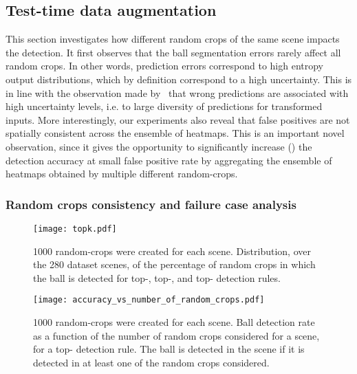 \documentclass[sigconf, screen]{acmart}
\begin{document}
\subsection{Test-time data augmentation}
\label{subsec:testtimeaugment}

This section investigates how different random crops of the same scene impacts the detection. It first observes
that the ball segmentation errors rarely affect all random crops. In other words, prediction errors correspond to high entropy output distributions, which by definition correspond to a high uncertainty. This is in line with the observation made by~\cite{Ayhan2018, Wang2019} that wrong predictions are associated with high uncertainty levels, i.e. to large diversity of predictions for transformed inputs.
More interestingly, our experiments also reveal that false positives are not spatially consistent across the ensemble of heatmaps. This is an important novel observation, since it gives the opportunity to significantly increase () the detection accuracy at small false positive rate by aggregating the ensemble of heatmaps obtained by multiple different random-crops.

\subsubsection{Random crops consistency and failure case analysis}

\begin{figure}
    \begin{center}
    \texttt{[image: topk.pdf]}
    \caption{1000 random-crops were created for each scene.
    Distribution, over the 280 dataset scenes, of the percentage of random crops in which the ball is detected for top-, top-, and top- detection rules.}
    \label{fig:topk_helps}
    \end{center}
\end{figure}


\begin{figure}
    \begin{center}
    \texttt{[image: accuracy\_vs\_number\_of\_random\_crops.pdf]}
    \caption{1000 random-crops were created for each scene.
    Ball detection rate as a function of the number of random crops considered for a scene, for a top- detection rule. The ball is detected in the scene if it is detected in at least one of the random crops considered.}
    \label{fig:multiple_random_crops}
    \end{center}
\end{figure}
\end{document}
